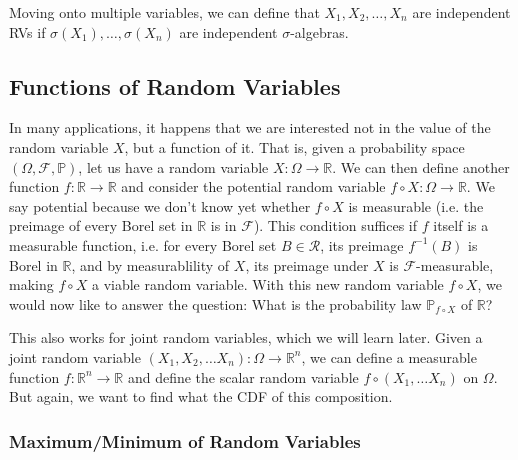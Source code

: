 \documentclass{article}
\begin{document}
    Moving onto multiple variables, we can define that $X_1, X_2, \ldots, X_n$ are independent RVs if $\sigma(X_1), \ldots, \sigma(X_n)$ are independent $\sigma$-algebras. 

  \subsection{Functions of Random Variables}

    In many applications, it happens that we are interested not in the value of the random variable $X$, but a function of it. That is, given a probability space $(\Omega, \mathcal{F}, \mathbb{P})$, let us have a random variable $X: \Omega \rightarrow \mathbb{R}$. We can then define another function $f: \mathbb{R} \rightarrow \mathbb{R}$ and consider the potential random variable $f \circ X : \Omega \rightarrow \mathbb{R}$. We say potential because we don't know yet whether $f \circ X$ is measurable (i.e. the preimage of every Borel set in $\mathbb{R}$ is in $\mathcal{F}$). This condition suffices if $f$ itself is a measurable function, i.e. for every Borel set $B \in \mathcal{R}$, its preimage $f^{-1} (B)$ is Borel in $\mathbb{R}$, and by measurablility of $X$, its preimage under $X$ is $\mathcal{F}$-measurable, making $f \circ X$ a viable random variable. With this new random variable $f \circ X$, we would now like to answer the question: What is the probability law $\mathbb{P}_{f \circ X}$ of $\mathbb{R}$? 

    This also works for joint random variables, which we will learn later. Given a joint random variable $(X_1, X_2, \ldots X_n): \Omega \rightarrow \mathbb{R}^n$, we can define a measurable function $f: \mathbb{R}^n \longrightarrow \mathbb{R}$ and define the scalar random variable $f \circ (X_1, \ldots X_n)$ on $\Omega$. But again, we want to find what the CDF of this composition. 

    \subsubsection{Maximum/Minimum of Random Variables}
\end{document}
